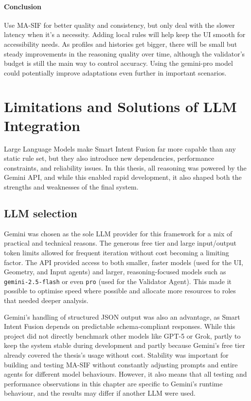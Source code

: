 \documentclass[openany]{book}
\begin{document}
\paragraph{Conclusion}
Use MA-SIF for better quality and consistency, but only deal with the slower latency when it’s a necessity. Adding local rules will help keep the UI smooth for accessibility needs. As profiles and histories get bigger, there will be small but steady improvements in the reasoning quality over time, although the validator’s budget is still the main way to control accuracy. Using the gemini-pro model could potentially improve adaptations even further in important scenarios.

\section{Limitations and Solutions of LLM Integration}
Large Language Models make Smart Intent Fusion far more capable than any static rule set, but they also introduce new dependencies, performance constraints, and reliability issues. In this thesis, all reasoning was powered by the Gemini API, and while this enabled rapid development, it also shaped both the strengths and weaknesses of the final system.

\subsection{LLM selection}
Gemini was chosen as the sole LLM provider for this framework for a mix of practical and technical reasons. The generous free tier and large input/output token limits allowed for frequent iteration without cost becoming a limiting factor. The API provided access to both smaller, faster models (used for the UI, Geometry, and Input agents) and larger, reasoning-focused models such as \texttt{gemini-2.5-flash} or even \texttt{pro} (used for the Validator Agent). This made it possible to optimise speed where possible and allocate more resources to roles that needed deeper analysis.

Gemini’s handling of structured JSON output was also an advantage, as Smart Intent Fusion depends on predictable schema-compliant responses. While this project did not directly benchmark other models like GPT-5 or Grok, partly to keep the system stable during development and partly because Gemini’s free tier already covered the thesis’s usage without cost. Stability was important for building and testing MA-SIF without constantly adjusting prompts and entire agents for different model behaviours. However, it also means that all testing and performance observations in this chapter are specific to Gemini’s runtime behaviour, and the results may differ if another LLM were used.
\end{document}
